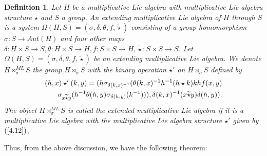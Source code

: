 \documentclass[10 pt,oneside,reqno,a4paper]{amsart}
\newtheorem{definition}{Definition}[section]
\numberwithin{equation}{section}
\begin{document}
\begin{definition}
    Let $H$ be a multiplicative Lie algebra with multiplicative Lie algebra structure $\star$ and $S$ a group. An extending multiplicative Lie algebra of $H$ through $S$ is a system $\Omega(H,S)=(\sigma,\delta,\theta,f,\widetilde{\star})$ consisting of a group homomorphism $\sigma: S \to Aut(H)$ and four other maps $\delta: H \times S \to S, \theta:H \times S \to H, f: S \times S \to H, \widetilde{\star}: S \times S\to S $. Let $\Omega(H,S)=(\sigma,\delta,\theta,f,\widetilde{\star})$ be an extending multiplicative Lie algebra. We denote $H \rtimes_{\sigma}^{ML}S$ the group $H \rtimes_{\sigma}S$ with the binary operation $\star'$ on $H \rtimes_{\sigma}S$ defined by
    \begin{align}\label{4.12}
        (h,x) \star' (k,y)= (h \sigma_{\delta(k,x)^{-1}}(\theta(k,x)^{-1}h^{-1}(h \star k)kh f(x,y) \notag\\\sigma_{x\widetilde{\star}y}(h^{-1}\theta(h,y)\sigma_{\delta(h,y)}(k^{-1}))), \delta(k,x)^{-1}(x \widetilde{\star} y)\delta(h,y)). 
    \end{align}
 The object $H \rtimes_{\sigma}^{ML}S$ is called the extended multiplicative Lie algebra if it is a multiplicative Lie algebra with the multiplicative Lie algebra structure $\star'$ given by $(\ref{4.12})$.
\end{definition}

Thus, from the above discussion, we have the following theorem:
\end{document}
